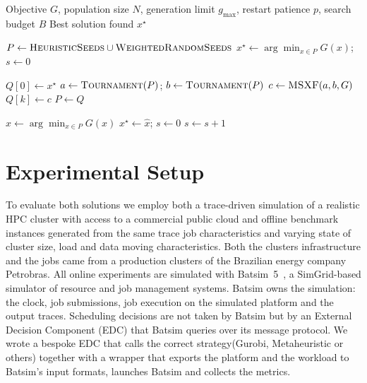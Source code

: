 \documentclass[conference]{IEEEtran}
\begin{document}
\begin{algorithm}[t]
  \caption{Genetic Algorithm}
  \label{alg:memetic-search}
  \small
  \begin{algorithmic}[1]
    \Require Objective $G$, population size $N$, generation limit
             $g_{\max}$, restart patience $p$, search budget $B$
    \Ensure Best solution found $x^\star$

    \State $P \gets
      \Call{HeuristicSeeds}{} \cup \Call{WeightedRandomSeeds}{}$
      \State {}
    \EndFor
    \State $x^\star \gets \arg\min_{x \in P} G(x)$;
           \quad $s \gets 0$

    \Statex
      \State $Q[0] \gets x^\star$ 
        \State $a \gets \Call{Tournament}{P}$;
               \quad $b \gets \Call{Tournament}{P}$
        \State $c \gets \Call{MSXF}{a,b,G}$
        \State {}
        \State {}
        \State $Q[k] \gets c$
      \EndParFor
      \State $P \gets Q$

      \Statex
      \State $\widehat{x} \gets \arg\min_{x \in P} G(x)$
        \State $x^\star \gets \widehat{x}$;
               \quad $s \gets 0$
      \Else
        \State $s \gets s+1$
      \EndIf
        \State {}
      \EndIf
    \EndFor

    \Statex
    \State \Return {}
  \end{algorithmic}
\end{algorithm}



\section{Experimental Setup}
\label{sec:experimental_setup}

To evaluate both solutions we employ both a trace-driven simulation of a realistic HPC cluster with access to a commercial public cloud and offline benchmark instances generated from the same trace job characteristics and varying state of cluster size, load and data moving characteristics. Both the clusters infrastructure and the jobs came from a production clusters of the Brazilian energy company Petrobras.
All online experiments are simulated with Batsim~5~\cite{batsim_jsspp16}, a SimGrid-based simulator of resource and job management systems. Batsim owns the simulation: the clock, job submissions, job execution on the simulated platform and the output traces. Scheduling decisions are not taken by Batsim but by an External Decision Component (EDC) that Batsim queries over its message protocol. We wrote a bespoke EDC that calls the correct strategy(Gurobi, Metaheuristic or others) together with a wrapper that exports the platform and the workload to Batsim's input formats, launches Batsim and collects the metrics. 
\end{document}
